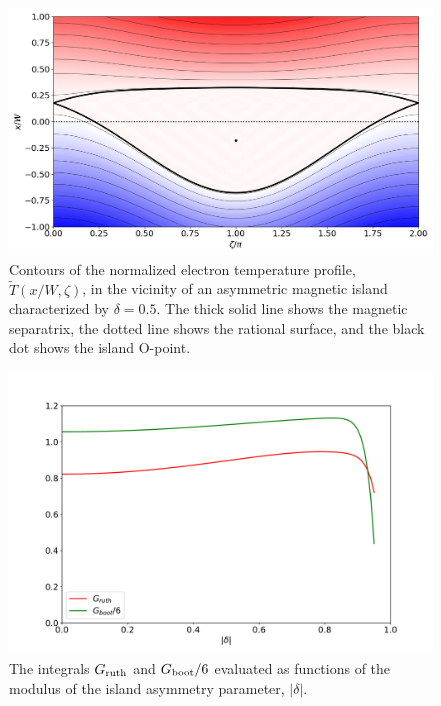 \documentclass[12pt,prb,aps]{revtex4-1}
\begin{document}
\begin{figure}
\centerline{\includegraphics[width=\textwidth]{Fig7.png}}
\caption{Contours of the normalized electron temperature profile, $\tilde{T}(x/W,\zeta)$, in the vicinity of an asymmetric magnetic island  characterized by
$\delta = 0.5$. The thick solid line shows the magnetic separatrix, the dotted line shows the rational surface, and the black dot shows the
island O-point.\label{fig5}}
\end{figure}

\begin{figure}
\centerline{\includegraphics[width=\textwidth]{Fig8.pdf}}
\caption{The integrals $G_{\rm ruth}$ and $G_{\rm boot}/6$ evaluated as functions of the modulus of the island asymmetry parameter, $|\delta|$.  \label{fig6}}
\end{figure}
\end{document}
